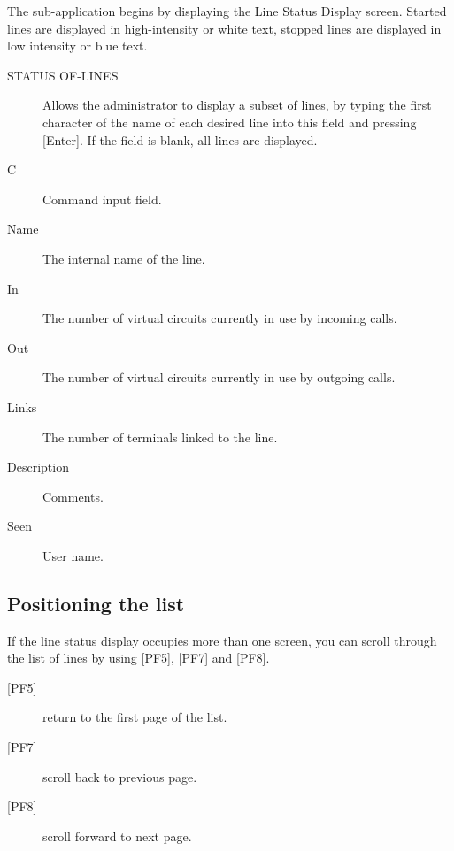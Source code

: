 \documentclass[letterpaper,10pt,english]{sphinxmanual}
\begin{document}
The sub-application begins by displaying the Line Status Display screen. Started lines are displayed in high-intensity or white text, stopped lines are displayed in low intensity or blue text.


\begin{description}
\item[{STATUS OF-LINES}] \leavevmode
Allows the administrator to display a subset of lines, by typing the
first character of the name of each desired line into this field and
pressing {[}Enter{]}. If the field is blank, all lines are displayed.

\item[{C}] \leavevmode
Command input field.

\item[{Name}] \leavevmode
The internal name of the line.

\item[{In}] \leavevmode
The number of virtual circuits currently in use by incoming calls.

\item[{Out}] \leavevmode
The number of virtual circuits currently in use by outgoing calls.

\item[{Links}] \leavevmode
The number of terminals linked to the line.

\item[{Description}] \leavevmode
Comments.

\item[{Seen}] \leavevmode
User name.

\end{description}


\subsection{Positioning the list}
\label{\detokenize{audit_operations_ and_performance:positioning-the-list}}
If the line status display occupies more than one screen, you can scroll through the list of lines by using {[}PF5{]}, {[}PF7{]} and {[}PF8{]}.
\begin{description}
\item[{{[}PF5{]}}] \leavevmode
return to the first page of the list.

\item[{{[}PF7{]}}] \leavevmode
scroll back to previous page.

\item[{{[}PF8{]}}] \leavevmode
scroll forward to next page.

\end{description}
\end{document}
